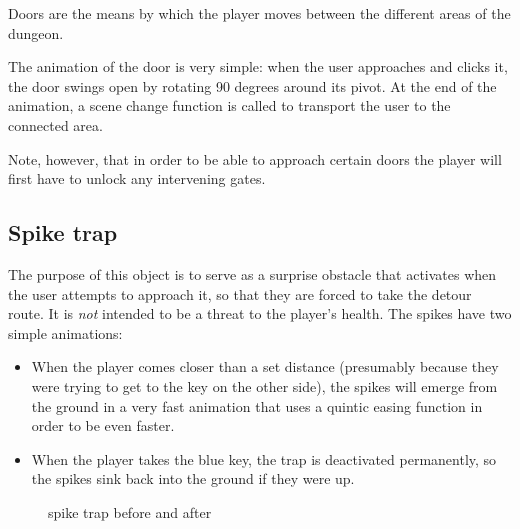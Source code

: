 Doors are the means by which the player moves between the different areas of the dungeon.

The animation of the door is very simple: when the user approaches and clicks it, the door swings open by rotating 90 degrees around its pivot. At the end of the animation, a scene change function is called to transport the user to the connected area.

Note, however, that in order to be able to approach certain doors the player will first have to unlock any intervening gates.


\subsection{Spike trap}


The purpose of this object is to serve as a surprise obstacle that activates when the user attempts to approach it, so that they are forced to take the detour route. It is \textit{not} intended to be a threat to the player's health. The spikes have two simple animations:

\begin{itemize}
    \item When the player comes closer than a set distance (presumably because they were trying to get to the key on the other side), the spikes will emerge from the ground in a very fast animation that uses a quintic easing function in order to be even faster.
    \item When the player takes the blue key, the trap is deactivated permanently, so the spikes sink back into the ground if they were up.
\end{itemize}

\begin{figure}[H]
    \centering
    \caption{spike trap before and after}
    \label{fig:trap1}
    \label{fig:trap2}
\end{figure}



